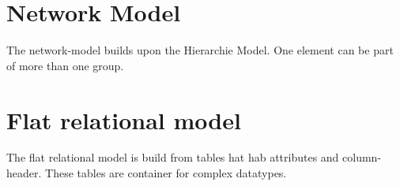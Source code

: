 \section{Network Model}
The network-model builds upon the Hierarchie Model. One element can be part of
more than one group.

\section{Flat relational model}
The flat relational model is build from tables hat hab attributes and
column-header. These tables are container for complex datatypes.
